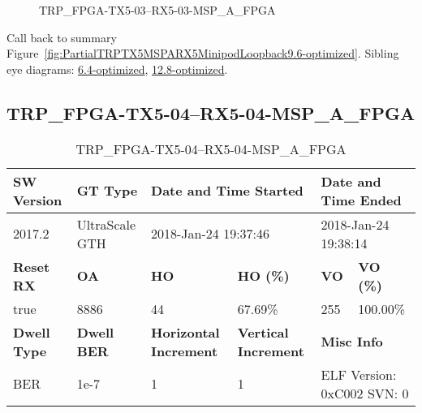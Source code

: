 \begin{figure}[h]
\caption{TRP\_FPGA-TX5-03--RX5-03-MSP\_A\_FPGA} \label{fig:TRPFPGATX503RX503MSPAFPGA9.6-optimized}
\end{figure}

Call back to summary Figure~\ref{fig:PartialTRPTX5MSPARX5MinipodLoopback9.6-optimized}.
Sibling eye diagrams: \hyperref[sec:TRPFPGATX503RX503MSPAFPGA6.4-optimized]{6.4-optimized}, \hyperref[sec:TRPFPGATX503RX503MSPAFPGA12.8-optimized]{12.8-optimized}.

\clearpage
\newpage


\subsection{TRP\_FPGA-TX5-04--RX5-04-MSP\_A\_FPGA}\label{sec:TRPFPGATX504RX504MSPAFPGA9.6-optimized}

\begin{table}[h]
\centering
\caption{TRP\_FPGA-TX5-04--RX5-04-MSP\_A\_FPGA}
\label{tab:TRPFPGATX504RX504MSPAFPGA9.6-optimized}
\begin{tabular}{@{}|l|l|l|l|l|l|@{}}
\toprule
\textbf{SW Version}                & \textbf{GT Type}   & \multicolumn{2}{l|}{\textbf{Date and Time Started}}            & \multicolumn{2}{l|}{\textbf{Date and Time Ended}}        \\ \midrule
2017.2                       & UltraScale GTH          & \multicolumn{2}{l|}{2018-Jan-24 19:37:46}                   & \multicolumn{2}{l|}{2018-Jan-24 19:38:14}               \\ \midrule
\textbf{Reset RX}                  & \textbf{OA} & \textbf{HO}   & \textbf{HO (\%)} & \textbf{VO} & \textbf{VO (\%)} \\ \midrule
true & 8886        & 44          & 67.69\%        & 255        & 100.00\%       \\ \midrule
\textbf{Dwell Type}                & \textbf{Dwell BER} & \textbf{Horizontal Increment} & \textbf{Vertical Increment}    & \multicolumn{2}{l|}{\textbf{Misc Info}}                  \\ \midrule
BER                            & 1e-7        & 1        & 1           & \multicolumn{2}{l|}{ELF Version: 0xC002 SVN: 0}                         \\ \bottomrule
\end{tabular}
\end{table}

